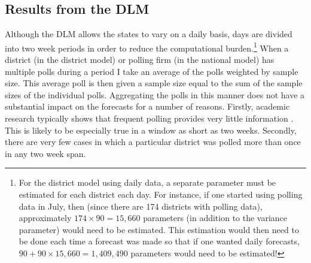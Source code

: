 \documentclass[12pt,final,fleqn]{article}
\theoremstyle{plain}
\begin{document}
\subsection{Results from the DLM} \label{sec: Results from the DLM}
Although the DLM allows the states to vary on a daily basis, days are divided into two week periods in order to reduce the computational burden.\footnote{For the district model using daily data, a separate parameter must be estimated for each district each day. For instance, if one started using polling data in July, then (since there are 174 districts with polling data), approximately $174 \times 90 =  15,660$ parameters (in addition to the variance parameter) would need to be estimated. This estimation would then need to be done each time a forecast was made so that if one wanted daily forecasts, $90 + 90 \times 15,660 =  1,409,490$ parameters would need to be estimated!} When a district (in the district model) or polling firm (in the national model) has multiple polls during a period I take an average of the polls weighted by sample size. This average poll is then given a sample size equal to the sum of the sample sizes of the individual polls. Aggregating the polls in this manner does not have a substantial impact on the forecasts for a number of reasons. Firstly, academic research typically shows that frequent polling provides very little information \citep[e.g.][]{gelman1993american, lock2010bayesian}. This is likely to be especially true in a window as short as two weeks. Secondly, there are very few cases in which a particular district was polled more than once in any two week span. 
\end{document}
